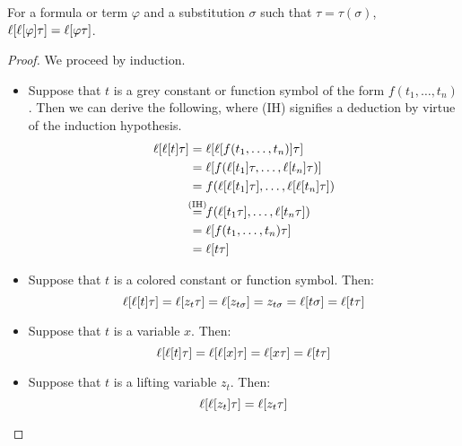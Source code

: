 %
%
\begin{lemma}
	\label{lemma:lifting_tau_commute}
	For a formula or term $\varphi$ and a substitution $\sigma$ such that $\tau = \tau(\sigma)$,
	$\lifboth{\lifboth{ \varphi} \tau} =\nolinebreak \lifboth{ \varphi \tau } $.
\end{lemma}
\begin{proof}
	We proceed by induction.

	\begin{itemize}
		\item Suppose that $t$ is a grey constant or function symbol of the form $f(t_1, \dots, t_n)$.
			Then we can derive the following, where (IH) signifies a deduction by virtue of the induction hypothesis. 
			\begin{align*}
				\lifboth{\lifboth{t}\tau} &= \lifboth{\lifboth{ f(t_1, \dots, t_n)}\tau} \\
																													&= \lifboth{ f(\lifboth{t_1}\tau, \dots, \lifboth{t_n}\tau) } \\
																											&= f(\lifboth{\lifboth{t_1}\tau}, \dots, \lifboth{\lifboth{t_n}\tau}) \\
																									&\stackrel{\mathclap{\text{(IH)}}}= f(\lifboth{t_1\tau}, \dots, \lifboth{t_n\tau}) \\
																							&= \lifboth{f(t_1, \dots, t_n)\tau} \\
																					 &= \lifboth{t\tau}
			\end{align*}
		\item Suppose that $t$ is a colored constant or function symbol. Then:
			\[
				\ell[\ell[t]\tau]= \ell[z_t\tau] 
				= \ell[z_{t\sigma}] 
				= z_{t\sigma} 
				= \ell[t\sigma] 
				= \ell[t\tau]
			\]
		\item Suppose that $t$ is a variable $x$. Then:
			\[
				\ell[\ell[t]\tau] = \ell[\ell[ x]\tau] = \ell[x\tau] = \ell[t\tau]
			\]
		\item Suppose that $t$ is a lifting variable $z_t$. Then:
			\[
				\ell[\ell[z_t]\tau] = \ell[z_t\tau] 
				\qedhere
			\]
	\end{itemize}

\end{proof}

